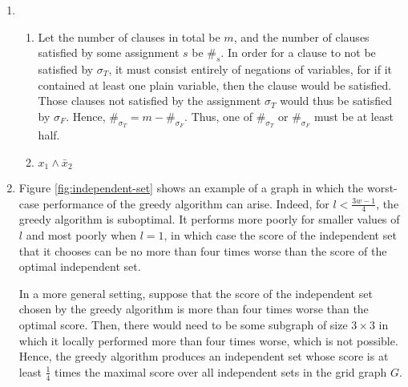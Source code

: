 \documentclass[letterpaper,11pt]{article}
\begin{document}
\begin{enumerate}
    \item
        \begin{enumerate}
            \item
                Let the number of clauses in total be $m$, and the number of
                clauses satisfied by some assignment $s$ be $\#_s$. In order
                for a clause to not be satisfied by $\sigma_T$, it must
                consist entirely of negations of variables, for if it contained
                at least one plain variable, then the clause would be
                satisfied. Those clauses not satisfied by the assignment
                $\sigma_T$ would thus be satisfied by $\sigma_F$. Hence,
                $\#_{\sigma_T} = m - \#_{\sigma_F}$. Thus, one of
                $\#_{\sigma_T}$ or $\#_{\sigma_F}$ must be at least half.

            \item
                $x_1 \land \bar x_2$
        \end{enumerate}

    \item Figure \ref{fig:independent-set} shows an example of a graph in which
        the worst-case performance of the greedy algorithm can arise. Indeed,
        for $l < \frac{3w - 1}{4}$, the greedy algorithm is suboptimal. It
        performs more poorly for smaller values of $l$ and most poorly when
        $l = 1$, in which case the score of the independent set that it chooses
        can be no more than four times worse than the score of the optimal
        independent set.

        In a more general setting, suppose that the score of the independent
        set chosen by the greedy algorithm is more than four times worse than
        the optimal score. Then, there would need to be some subgraph of size
        $3 \times 3$ in which it locally performed more than four times worse,
        which is not possible. Hence, the greedy algorithm produces an
        independent set whose score is at least $\frac{1}{4}$ times the maximal
        score over all independent sets in the grid graph $G$.

        \begin{figure}[ht]
            \centering
\end{figure}
\end{enumerate}
\end{document}
